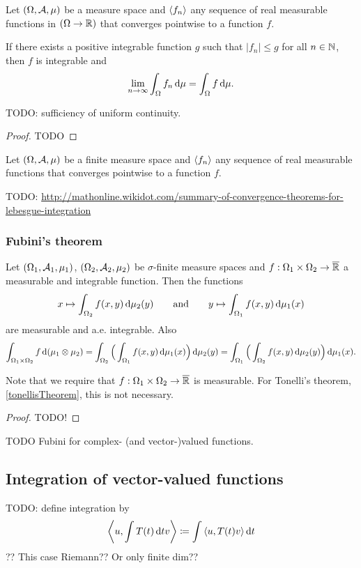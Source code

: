 \begin{theorem}
Let $\sSet{\Omega, \mathcal{A}, \mu}$ be a measure space and $\left\langle f_n \right\rangle$ any sequence of real measurable functions in $(\Omega\to\mathbb{R})$ that converges pointwise to a function $f$.

If there exists a positive integrable function $g$ such that $|f_n| \leq g$ for all $n\in \mathbb{N}$, then $f$ is integrable and
\[ \lim_{n\to \infty}\int_\Omega f_n \operatorname{d \!}{\mu} = \int_\Omega f\operatorname{d \!}{\mu}. \]
\end{theorem}
TODO: sufficiency of uniform continuity.
\begin{proof}
TODO
\end{proof}
\begin{corollary} \label{boundedConvergenceTheorem}
Let $\sSet{\Omega, \mathcal{A}, \mu}$ be a finite measure space and $\left\langle f_n \right\rangle$ any sequence of real measurable functions that converges pointwise to a function $f$.
\end{corollary}
TODO: \url{http://mathonline.wikidot.com/summary-of-convergence-theorems-for-lebesgue-integration}

\subsubsection{Fubini's theorem}
\begin{theorem}
Let $\sSet{\Omega_1, \mathcal{A}_1, \mu_1}$, $\sSet{\Omega_2, \mathcal{A}_2, \mu_2}$ be $\sigma$-finite measure spaces and $f: \Omega_1\times\Omega_2 \to \overline{\mathbb{R}}$ a measurable and integrable function. Then the functions
\[ x\mapsto \int_{\Omega_2}f(x,y)\operatorname{d \!}{\mu_2(y)} \qquad\text{and}\qquad y\mapsto \int_{\Omega_1}f(x,y)\operatorname{d \!}{\mu_1(x)} \]
are measurable and a.e. integrable. Also
\[ \int_{\Omega_1\times\Omega_2}f\operatorname{d \!}{(\mu_1\otimes\mu_2)} = \int_{\Omega_2}\Big(\int_{\Omega_1}f(x,y)\operatorname{d \!}{\mu_1(x)}\Big)\operatorname{d \!}{\mu_2(y)} = \int_{\Omega_1}\Big(\int_{\Omega_2}f(x,y)\operatorname{d \!}{\mu_2(y)}\Big)\operatorname{d \!}{\mu_1(x)}. \]
\end{theorem}
Note that we require that $f: \Omega_1\times\Omega_2 \to \overline{\mathbb{R}}$ is measurable. For Tonelli's theorem, \ref{tonellisTheorem}, this is not necessary.
\begin{proof}
TODO!
\end{proof}

TODO Fubini for complex- (and vector-)valued functions.

\subsection{Integration of vector-valued functions}
TODO: define integration by
\[ \left\langle u, \int T(t)\operatorname{d \!}{t} v \right\rangle \coloneqq \int\left\langle u,T(t)v \right\rangle\operatorname{d \!}{t} \]
??
This case Riemann?? Or only finite dim??

